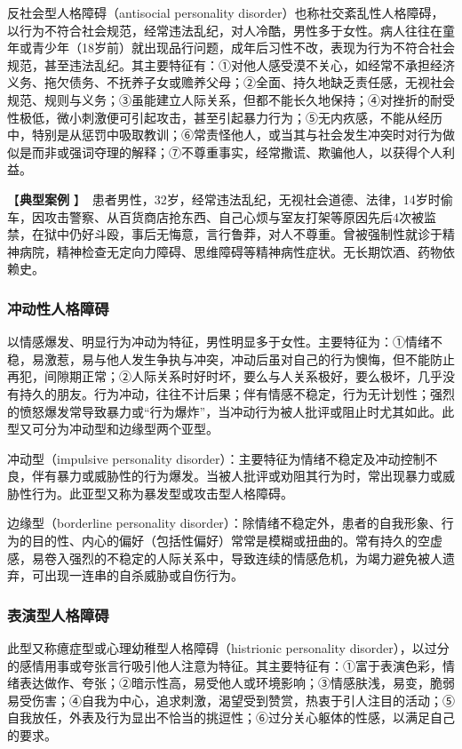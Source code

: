 反社会型人格障碍（antisocial personality
disorder）也称社交紊乱性人格障碍，以行为不符合社会规范，经常违法乱纪，对人冷酷，男性多于女性。病人往往在童年或青少年（18岁前）就出现品行问题，成年后习性不改，表现为行为不符合社会规范，甚至违法乱纪。其主要特征有：①对他人感受漠不关心，如经常不承担经济义务、拖欠债务、不抚养子女或赡养父母；②全面、持久地缺乏责任感，无视社会规范、规则与义务；③虽能建立人际关系，但都不能长久地保持；④对挫折的耐受性极低，微小刺激便可引起攻击，甚至引起暴力行为；⑤无内疚感，不能从经历中，特别是从惩罚中吸取教训；⑥常责怪他人，或当其与社会发生冲突时对行为做似是而非或强词夺理的解释；⑦不尊重事实，经常撒谎、欺骗他人，以获得个人利益。

【\textbf{典型案例}
】　{患者男性，32岁，经常违法乱纪，无视社会道德、法律，14岁时偷车，因攻击警察、从百货商店抢东西、自己心烦与室友打架等原因先后4次被监禁，在狱中仍好斗殴，事后无悔意，言行鲁莽，对人不尊重。曾被强制性就诊于精神病院，精神检查无定向力障碍、思维障碍等精神病性症状。无长期饮酒、药物依赖史。}

\subsubsection{冲动性人格障碍}

以情感爆发、明显行为冲动为特征，男性明显多于女性。主要特征为：①情绪不稳，易激惹，易与他人发生争执与冲突，冲动后虽对自己的行为懊悔，但不能防止再犯，间隙期正常；②人际关系时好时坏，要么与人关系极好，要么极坏，几乎没有持久的朋友。行为冲动，往往不计后果；伴有情感不稳定，行为无计划性；强烈的愤怒爆发常导致暴力或“行为爆炸”，当冲动行为被人批评或阻止时尤其如此。此型又可分为冲动型和边缘型两个亚型。

冲动型（impulsive personality
disorder）：主要特征为情绪不稳定及冲动控制不良，伴有暴力或威胁性的行为爆发。当被人批评或劝阻其行为时，常出现暴力或威胁性行为。此亚型又称为暴发型或攻击型人格障碍。

边缘型（borderline personality
disorder）：除情绪不稳定外，患者的自我形象、行为的目的性、内心的偏好（包括性偏好）常常是模糊或扭曲的。常有持久的空虚感，易卷入强烈的不稳定的人际关系中，导致连续的情感危机，为竭力避免被人遗弃，可出现一连串的自杀威胁或自伤行为。

\subsubsection{表演型人格障碍}

此型又称癔症型或心理幼稚型人格障碍（histrionic personality
disorder），以过分的感情用事或夸张言行吸引他人注意为特征。其主要特征有：①富于表演色彩，情绪表达做作、夸张；②暗示性高，易受他人或环境影响；③情感肤浅，易变，脆弱易受伤害；④自我为中心，追求刺激，渴望受到赞赏，热衷于引人注目的活动；⑤自我放任，外表及行为显出不恰当的挑逗性；⑥过分关心躯体的性感，以满足自己的要求。

